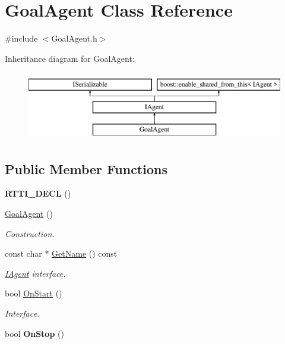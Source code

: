 \hypertarget{class_goal_agent}{}\section{Goal\+Agent Class Reference}
\label{class_goal_agent}


{\ttfamily \#include $<$Goal\+Agent.\+h$>$}

Inheritance diagram for Goal\+Agent\+:\begin{figure}[H]
\begin{center}
\leavevmode
\includegraphics[height=3.000000cm]{class_goal_agent}
\end{center}
\end{figure}
\subsection*{Public Member Functions}
\begin{DoxyCompactItemize}
\item 
\mbox{\label{class_goal_agent_a60bcb89ec117fb470a9c34b36fcbca0d}} 
{\bfseries R\+T\+T\+I\+\_\+\+D\+E\+CL} ()
\item 
\mbox{\label{class_goal_agent_a750c0d6e115e0465a93ff0432149aafa}} 
\hyperlink{class_goal_agent_a750c0d6e115e0465a93ff0432149aafa}{Goal\+Agent} ()
\begin{DoxyCompactList}\small\item\em Construction. \end{DoxyCompactList}\item 
\mbox{\label{class_goal_agent_a0da566247d12224944419be690310a1c}} 
const char $\ast$ \hyperlink{class_goal_agent_a0da566247d12224944419be690310a1c}{Get\+Name} () const
\begin{DoxyCompactList}\small\item\em \hyperlink{class_i_agent}{I\+Agent} interface. \end{DoxyCompactList}\item 
\mbox{\label{class_goal_agent_a5036cfe447ac9867e813bce49c77cf71}} 
bool \hyperlink{class_goal_agent_a5036cfe447ac9867e813bce49c77cf71}{On\+Start} ()
\begin{DoxyCompactList}\small\item\em Interface. \end{DoxyCompactList}\item 
\mbox{\label{class_goal_agent_ad3d76e7667e01b1a846f44e7512b40e4}} 
bool {\bfseries On\+Stop} ()
\end{DoxyCompactItemize}
